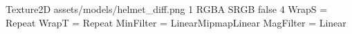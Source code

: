 Texture2D
assets/models/helmet_diff.png
1
RGBA
SRGB
false
4
WrapS = Repeat
WrapT = Repeat
MinFilter = LinearMipmapLinear
MagFilter = Linear
